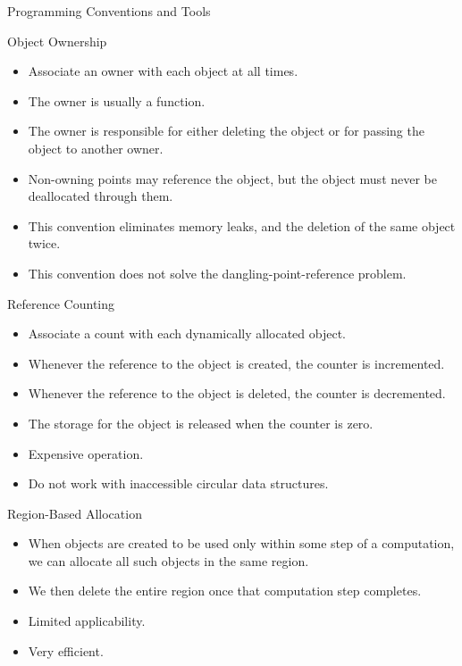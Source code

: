 \begin{bibunit}[apalike]
\begin{frame}[allowframebreaks]{Programming Conventions and Tools}
	\begin{block}{Object Ownership}
	\begin{itemize}
	\item Associate an owner with each object at all times.
	\item The owner is usually a function.
	\item The owner is responsible for either deleting the object or for passing the object to another owner.
	\item Non-owning points may reference the object, but the object must never be deallocated through them.
	\item This convention eliminates memory leaks, and the deletion of the same object twice.
	\item This convention does not solve the dangling-point-reference problem.
	\end{itemize}
	\end{block}
	\framebreak
	\begin{block}{Reference Counting}
	\begin{itemize}
	\item Associate a count with each dynamically allocated object.
	\item Whenever the reference to the object is created, the counter is incremented.
	\item Whenever the reference to the object is deleted, the counter is decremented.
	\item The storage for the object is released when the counter is zero.
	\item Expensive operation.
	\item Do not work with inaccessible circular data structures.
	\end{itemize}
	\end{block}
	\framebreak
	\begin{block}{Region-Based Allocation}
	\begin{itemize}
	\item When objects are created to be used only within some step of a computation, we can allocate all such objects in the same region.
	\item We then delete the entire region once that computation step completes.
	\item Limited applicability.
	\item Very efficient.
	\end{itemize}
	\end{block}
\end{frame}


\end{bibunit}
